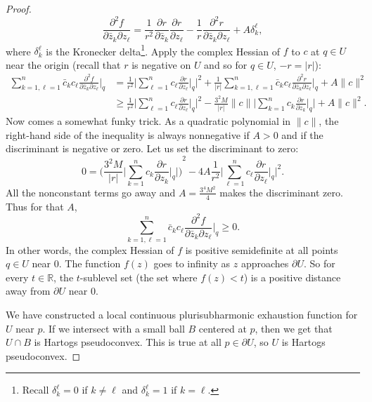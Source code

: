 \documentclass[12pt,openany]{book}
\newcommand{\sabs}[1]{\lvert {#1} \rvert}
\newcommand{\snorm}[1]{\lVert {#1} \rVert}
\newcommand{\BBabs}[1]{\Biggl\lvert {#1} \Biggr\rvert}
\newcommand{\R}{{\mathbb{R}}}
\theoremstyle{plain}
\theoremstyle{remark}
\theoremstyle{definition}
\theoremstyle{exercise}
\theoremstyle{example}
\begin{document}
\begin{proof}
\begin{equation*}
\frac{\partial^2 f}{\partial \bar{z}_k \partial z_\ell}
=
\frac{1}{r^2}
\frac{\partial r}{\partial \bar{z}_k}
\frac{\partial r}{\partial z_\ell}
-
\frac{1}{r}
\frac{\partial^2 r}{\partial \bar{z}_k \partial z_\ell}
+
A\delta_{k}^{\ell} ,
\end{equation*}
where $\delta_k^\ell$ is the Kronecker delta\footnote{%
Recall $\delta_k^\ell = 0$ if $k\not= \ell$ and $\delta_k^\ell = 1$ if $k =
\ell$.}.
Apply the complex Hessian of $f$ to $c$ at $q \in U$ near the origin
(recall that $r$ is negative on $U$ and so for $q \in U$, $-r = \sabs{r}$):
\begin{equation*}
\begin{split}
\sum_{k=1,\ell=1}^n
\bar{c}_k c_\ell \frac{\partial^2 f}{\partial \bar{z}_k \partial z_\ell} \Big|_q
& =
\frac{1}{r^2}
\BBabs{
\sum_{\ell=1}^n
c_\ell
\frac{\partial r}{\partial z_\ell} \Big|_q
}^2
+
\frac{1}{\sabs{r}}
\sum_{k=1,\ell=1}^n
\bar{c}_k
c_\ell
\frac{\partial^2 r}{\partial \bar{z}_k \partial z_\ell} \Big|_q
+
A \snorm{c}^2
\\
& \geq
\frac{1}{r^2}
\BBabs{
\sum_{\ell=1}^n
c_\ell
\frac{\partial r}{\partial z_\ell} \Big|_q
}^2
-
\frac{3^2 M}{\sabs{r}}
\snorm{c}\BBabs{\sum_{k=1}^n c_k \frac{\partial r}{\partial z_k} \Big|_q}
+
A \snorm{c}^2 .
\end{split}
\end{equation*}
Now comes a somewhat funky trick.
As a quadratic polynomial in $\snorm{c}$, the right-hand side of the
inequality
is always nonnegative if $A > 0$ and if the discriminant is negative or zero.
Let us set the discriminant to zero:
\begin{equation*}
0 =
{\Biggl(
\frac{3^2 M}{\sabs{r}}
\BBabs{\sum_{k=1}^n c_k \frac{\partial r}{\partial z_k} \Big|_q}
\Biggr)}^2
- 4A
\frac{1}{r^2}
\BBabs{
\sum_{\ell=1}^n
c_\ell
\frac{\partial r}{\partial z_\ell} \Big|_q
}^2 .
\end{equation*}
All the nonconstant terms go away and
$A=\frac{3^4 M^2}{4}$ makes the discriminant zero.  Thus for that $A$,
\begin{equation*}
\sum_{k=1,\ell=1}^n
\bar{c}_k c_\ell \frac{\partial^2 f}{\partial \bar{z}_k \partial z_\ell} \Big|_q
\geq 0.
\end{equation*}
In other words, the complex Hessian
of $f$ is positive semidefinite at all points $q \in U$ near $0$.
The function $f(z)$ goes to infinity as $z$ approaches $\partial U$.
So for every $t \in \R$, the $t$-sublevel set
(the set where $f(z) < t$) is a positive
distance away from $\partial U$ near $0$.

We have constructed a local continuous plurisubharmonic
exhaustion function for $U$ near $p$.  If we intersect
with a small ball $B$ centered at $p$, then we get that $U \cap B$ is
Hartogs pseudoconvex.  This is true at all
$p \in \partial U$, so $U$ is Hartogs pseudoconvex.
\end{proof}
\end{document}
